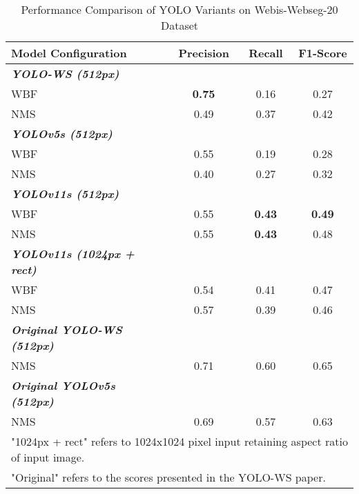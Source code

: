 \documentclass[conference]{IEEEtran}
\begin{document}
\begin{table}[htbp]
\caption{Performance Comparison of YOLO Variants on Webis-Webseg-20 Dataset}
\begin{center}
\begin{tabular}{l|ccc}
\hline
\textbf{Model Configuration} & \textbf{Precision} & \textbf{Recall} & \textbf{F1-Score}\\
\hline
\multicolumn{1}{l|}{\textit{\textbf{YOLO-WS (512px)}}} \\
\hspace{3mm}WBF & \textbf{0.75} & 0.16 & 0.27\\
\hspace{3mm}NMS & 0.49 & 0.37 & 0.42\\
\multicolumn{1}{l|}{\textit{\textbf{YOLOv5s (512px)}}} \\
\hspace{3mm}WBF & 0.55 & 0.19 & 0.28\\
\hspace{3mm}NMS & 0.40 & 0.27 & 0.32\\
\multicolumn{1}{l|}{\textit{\textbf{YOLOv11s (512px)}}} \\
\hspace{3mm}WBF & 0.55 & \textbf{0.43} & \textbf{0.49} \\
\hspace{3mm}NMS & 0.55 & \textbf{0.43} & 0.48 \\
\multicolumn{1}{l|}{\textit{\textbf{YOLOv11s (1024px + rect)}}} \\
\hspace{3mm}WBF & 0.54 & 0.41 & 0.47 \\
\hspace{3mm}NMS & 0.57 & 0.39 & 0.46 \\
\hline
\multicolumn{1}{l|}{\textit{\textbf{Original YOLO-WS (512px)}}} \\
\hspace{3mm}NMS & 0.71 & 0.60 & 0.65 \\
\multicolumn{1}{l|}{\textit{\textbf{Original YOLOv5s (512px)}}} \\
\hspace{3mm}NMS & 0.69 & 0.57 & 0.63 \\
\hline
\multicolumn{4}{l}{\scriptsize "1024px + rect" refers to 1024x1024 pixel input retaining aspect ratio of input image.}\\
\multicolumn{4}{l}{\scriptsize "Original" refers to the scores presented in the YOLO-WS paper.} \\
\end{tabular}
\label{tab:webis} 
\end{center}
\end{table}
\end{document}
